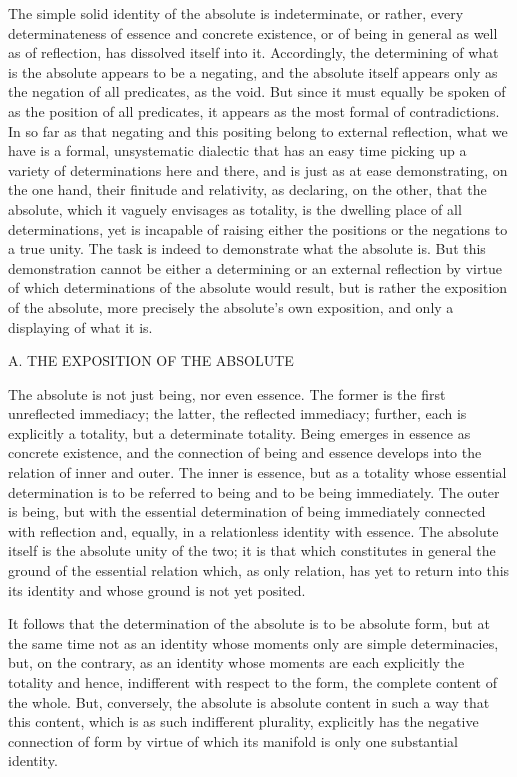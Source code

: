 The simple solid identity of the absolute is indeterminate,
or rather, every determinateness of essence and concrete existence,
or of being in general as well as of reflection,
has dissolved itself into it.
Accordingly, the determining of what is
the absolute appears to be a negating,
and the absolute itself appears only as
the negation of all predicates, as the void.
But since it must equally be spoken of
as the position of all predicates,
it appears as the most formal of contradictions.
In so far as that negating and this positing
belong to external reflection,
what we have is a formal, unsystematic dialectic
that has an easy time picking up
a variety of determinations here and there,
and is just as at ease demonstrating, on the one hand,
their finitude and relativity, as declaring, on the other,
that the absolute, which it vaguely envisages as totality,
is the dwelling place of all determinations,
yet is incapable of raising either
the positions or the negations to a true unity.
The task is indeed to demonstrate what the absolute is.
But this demonstration cannot be either
a determining or an external reflection
by virtue of which determinations of the absolute would result,
but is rather the exposition of the absolute,
more precisely the absolute's own exposition,
and only a displaying of what it is.

A. THE EXPOSITION OF THE ABSOLUTE

The absolute is not just being, nor even essence.
The former is the first unreflected immediacy;
the latter, the reflected immediacy;
further, each is explicitly a totality,
but a determinate totality.
Being emerges in essence as concrete existence,
and the connection of being and essence develops
into the relation of inner and outer.
The inner is essence, but as a totality
whose essential determination is
to be referred to being and to be being immediately.
The outer is being, but with the essential determination of
being immediately connected with reflection
and, equally, in a relationless identity with essence.
The absolute itself is the absolute unity of the two;
it is that which constitutes in general
the ground of the essential relation
which, as only relation, has yet
to return into this its identity
and whose ground is not yet posited.

It follows that the determination of
the absolute is to be absolute form,
but at the same time not as an identity
whose moments only are simple determinacies,
but, on the contrary, as an identity
whose moments are each explicitly the totality
and hence, indifferent with respect to the form,
the complete content of the whole.
But, conversely, the absolute is absolute content
in such a way that this content,
which is as such indifferent plurality,
explicitly has the negative connection of form
by virtue of which its manifold is
only one substantial identity.

